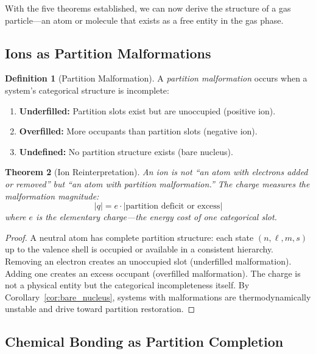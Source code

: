\documentclass[twocolumn,10pt,a4paper]{article}
\theoremstyle{plain}
\newtheorem{theorem}{Theorem}[section]
\theoremstyle{definition}
\newtheorem{definition}[theorem]{Definition}
\theoremstyle{remark}
\begin{document}
With the five theorems established, we can now derive the structure of a gas particle---an atom or molecule that exists as a free entity in the gas phase.

\subsection{Ions as Partition Malformations}

\begin{definition}[Partition Malformation]
\label{def:malformation}
A \emph{partition malformation} occurs when a system's categorical structure is incomplete:
\begin{enumerate}
    \item \textbf{Underfilled:} Partition slots exist but are unoccupied (positive ion).
    \item \textbf{Overfilled:} More occupants than partition slots (negative ion).
    \item \textbf{Undefined:} No partition structure exists (bare nucleus).
\end{enumerate}
\end{definition}

\begin{theorem}[Ion Reinterpretation]
\label{thm:ion}
An ion is not ``an atom with electrons added or removed'' but ``an atom with partition malformation.'' The charge measures the malformation magnitude:
\begin{equation}
    |q| = e \cdot |\text{partition deficit or excess}|
\end{equation}
where $e$ is the elementary charge---the energy cost of one categorical slot.
\end{theorem}

\begin{proof}
A neutral atom has complete partition structure: each state $(n, \ell, m, s)$ up to the valence shell is occupied or available in a consistent hierarchy. Removing an electron creates an unoccupied slot (underfilled malformation). Adding one creates an excess occupant (overfilled malformation). The charge is not a physical entity but the categorical incompleteness itself. By Corollary~\ref{cor:bare_nucleus}, systems with malformations are thermodynamically unstable and drive toward partition restoration.
\end{proof}

\subsection{Chemical Bonding as Partition Completion}
\end{document}
